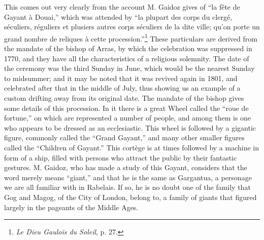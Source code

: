 \documentclass[a4paper, 11pt, oneside, polutonikogreek, english]{article}
\begin{document}
This comes out very clearly from the account M. Gaidoz gives of ``la fête de Gayant à Douai,'' which was attended by ``la plupart des corps du clergé, séculiers, réguliers et plusiers autres corps séculiers de la dite ville; qu'on porte un grand nombre de reliques à cette procession.''\footnote{\emph{Le Dieu Gaulois du Soleil}, p. 27.} These particulars are derived from the mandate of the bishop of Arras, by which the celebration was suppressed in 1770, and they have all the characteristics of a religious solemnity. The date of the ceremony was the third Sunday in June, which would be the nearest Sunday to midsummer; and it may be noted that it was revived again in 1801, and celebrated after that in the middle of July, thus showing us an example of a custom drifting away from its original date. The mandate of the bishop gives some details of this procession. In it there is a great Wheel called the ``roue de fortune,'' on which are represented a number of people, and among them is one who appears to be dressed as an ecclesiastic. This wheel is followed by a gigantic figure, commonly called the ``Grand Gayant,'' and many other smaller figures called the ``Children of Gayant.'' This cortège is at times followed by a machine in form of a ship, filled with persons who attract the public by their fantastic gestures. M. Gaidoz, who has made a study of this Gayant, considers that the word merely means ``giant,'' and that he is the same as Gargantua, a personage we are all familiar with in Rabelais. If so, he is no doubt one of the family that Gog and Magog, of the City of London, belong to, a family of giants that figured largely in the pageants of the Middle Ages.
\end{document}
